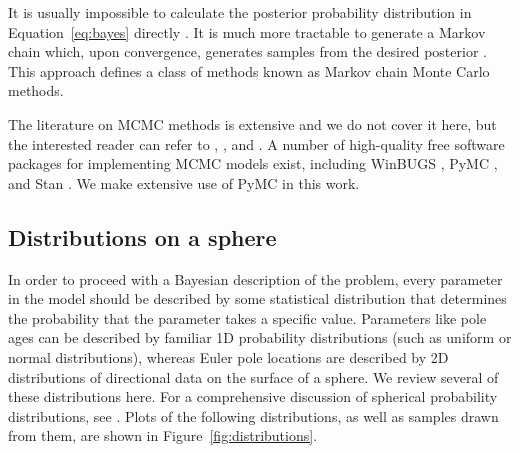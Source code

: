 \documentclass[preprint,12pt,authoryear]{elsarticle}
\begin{document}
It is usually impossible to calculate the posterior
probability distribution in Equation~\eqref{eq:bayes} directly \citep{davidson2015bayesian}. 
It is much more tractable to generate a Markov chain which, upon convergence,
generates samples from the desired posterior \citep{gelman2014bayesian}.
This approach defines a class of methods known as Markov chain Monte Carlo methods.

The literature on MCMC methods is extensive and we do not cover it here, but
the interested reader can refer to \citet{gelman1996markov}, \citet{sambridge2013transdimensional},
and \citet{davidson2015bayesian}. A number of high-quality free software packages
for implementing MCMC models exist, including WinBUGS \citep{lunn2000winbugs}, 
PyMC \citep{patil2010pymc}, and Stan \citep{carpenter2016stan}.
We make extensive use of PyMC in this work.

\subsection{Distributions on a sphere}

In order to proceed with a Bayesian description of the problem, every parameter
in the model should be described by some statistical distribution that determines
the probability that the parameter takes a specific value.
Parameters like pole ages can be described by familiar 1D probability distributions
(such as uniform or normal distributions), whereas Euler pole locations are
described by 2D distributions of directional data on the surface of a sphere.
We review several of these distributions here.
For a comprehensive discussion of spherical probability distributions,
see \citet{fisher1987statistical}. Plots of the following distributions, as well as
samples drawn from them, are shown in Figure~\ref{fig:distributions}. 
\end{document}
